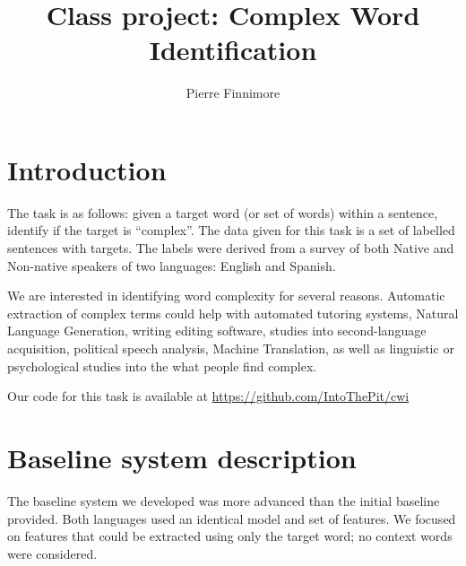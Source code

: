 \documentclass[11pt,a4paper]{article}
\title{Class project: Complex Word Identification}
\author{Pierre Finnimore}
\begin{document}
\maketitle
%

\section{Introduction}

The task is as follows: given a target word (or set of words) within a sentence, identify if the target is \enquote{complex}. The data given for this task is a set of labelled sentences with targets. The labels were derived from a survey of both Native and Non-native speakers of two languages: English and Spanish.

We are interested in identifying word complexity for several reasons. Automatic extraction of complex terms could help with automated tutoring systems, Natural Language Generation, writing editing software, studies into second-language acquisition, political speech analysis, Machine Translation, as well as linguistic or psychological studies into the what people find complex. 

Our code for this task is available at \url{https://github.com/IntoThePit/cwi}

\section{Baseline system description}

The baseline system we developed was more advanced than the initial baseline provided. Both languages used an identical model and set of features. We focused on features that could be extracted using only the target word; no context words were considered.
\end{document}
